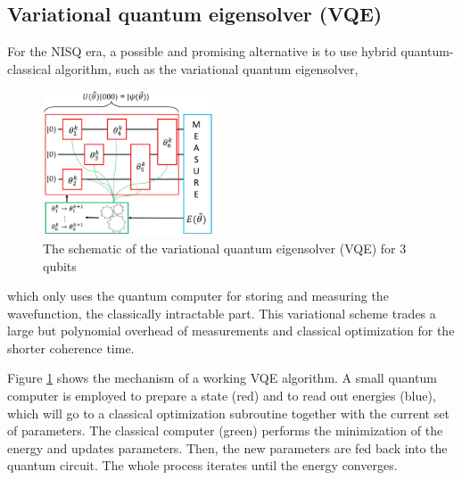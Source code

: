 \documentclass[journal=jctcce,manuscript=article]{achemso}
\begin{document}
\subsection{Variational quantum eigensolver (VQE)}
For the NISQ era, a possible and promising alternative is to use hybrid quantum-classical algorithm, such as the variational quantum eigensolver,\cite{Peruzzo:2014kca,yung:2014,McClean:2015bs}
\begin{figure}[h!]
\centering
\includegraphics[width=2.0in]{vqe.jpg}
\caption{The schematic of the variational quantum eigensolver (VQE) for 3 qubits}
\label{vqe-cir}
\end{figure}
which only uses the quantum computer for storing and measuring the wavefunction, the classically intractable part. This variational scheme trades a large but polynomial overhead of measurements and classical optimization for the shorter coherence time.

Figure \ref{vqe-cir} shows the mechanism of a working VQE algorithm. A small quantum computer is employed to prepare a state (red) and to read out energies (blue), which will go to a classical optimization subroutine together with the current set of parameters. The classical computer (green) performs the minimization of the energy and updates parameters. Then, the new parameters are fed back into the quantum circuit. The whole process iterates until the energy converges.



{}
\end{document}

